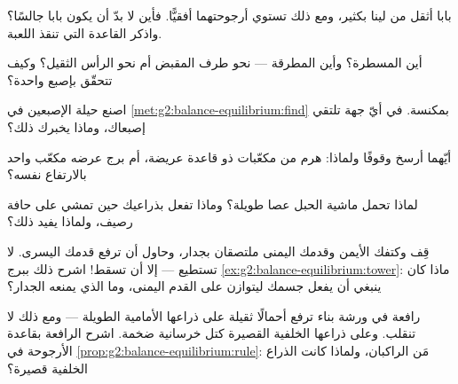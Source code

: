 \begin{exercise}[$\star$]\label{exo:g2:balance-equilibrium:4}
بابا أثقل من لينا بكثير، ومع ذلك تستوي أرجوحتهما أفقيًّا. فأين
لا بدّ أن يكون بابا جالسًا؟ واذكر القاعدة التي تنقذ اللعبة.
\end{exercise}

\begin{exercise}[$\star$]\label{exo:g2:balance-equilibrium:5}
أين  المسطرة؟ وأين  المطرقة --- نحو طرف
المقبض أم نحو الرأس الثقيل؟ وكيف تتحقّق بإصبع واحدة؟
\end{exercise}

\begin{exercise}[$\star$]\label{exo:g2:balance-equilibrium:6}
اصنع حيلة الإصبعين في \cref{met:g2:balance-equilibrium:find}
بمكنسة. في أيّ جهة تلتقي إصبعاك، وماذا يخبرك ذلك؟
\end{exercise}

\begin{exercise}[$\star$]\label{exo:g2:balance-equilibrium:7}
أيّهما أرسخ وقوفًا ولماذا: هرم من مكعّبات ذو قاعدة عريضة، أم برج
عرضه مكعّب واحد بالارتفاع نفسه؟
\end{exercise}

\begin{exercise}[$\star$]\label{exo:g2:balance-equilibrium:8}
لماذا تحمل ماشية الحبل عصا طويلة؟ وماذا تفعل بذراعيك حين تمشي
على حافة رصيف، ولماذا يفيد ذلك؟
\end{exercise}

\begin{exercise}[$\star$]\label{exo:g2:balance-equilibrium:9}
قِف وكتفك الأيمن وقدمك اليمنى ملتصقان بجدار، وحاول أن ترفع قدمك
اليسرى. لا تستطيع --- إلا أن تسقط! اشرح ذلك ببرج
\cref{ex:g2:balance-equilibrium:tower}: ماذا كان ينبغي أن يفعل
جسمك ليتوازن على القدم اليمنى، وما الذي يمنعه الجدار؟
\end{exercise}

\begin{exercise}[$\star\star$]\label{exo:g2:balance-equilibrium:10}
رافعة في ورشة بناء ترفع أحمالًا ثقيلة على ذراعها الأمامية
الطويلة --- ومع ذلك لا تنقلب. وعلى ذراعها الخلفية القصيرة كتل
خرسانية ضخمة. اشرح الرافعة بقاعدة الأرجوحة في
\cref{prop:g2:balance-equilibrium:rule}: مَن الراكبان، ولماذا
كانت الذراع الخلفية قصيرة؟
\end{exercise}
